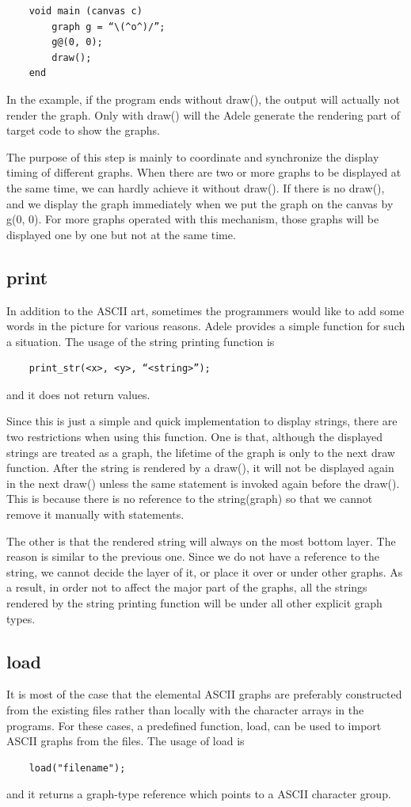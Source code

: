 \documentclass[11pt,letterpaper]{article}
\begin{document}
\begin{lstlisting}
	void main (canvas c)
		graph g = “\(^o^)/”;
		g@(0, 0);
		draw();
	end
\end{lstlisting}

In the example, if the program ends without draw(), the output will actually not render the graph. Only with draw() will the Adele generate the rendering part of target code to show the graphs.

The purpose of this step is mainly to coordinate and synchronize the display timing of different graphs. When there are two or more graphs to be displayed at the same time, we can hardly achieve it without draw(). If there is no draw(), and we display the graph immediately when we put the graph on the canvas by g\@(0, 0). For more graphs operated with this mechanism, those graphs will be displayed one by one but not at the same time.

\subsection {print}
In addition to the ASCII art, sometimes the programmers would like to add some words in the picture for various reasons. Adele provides a simple function for such a situation. The usage of the string printing function is
\begin{lstlisting}
	print_str(<x>, <y>, “<string>”);
\end{lstlisting}
and it does not return values.

Since this is just a simple and quick implementation to display strings, there are two restrictions when using this function. One is that, although the displayed strings are treated as a graph, the lifetime of the graph is only to the next draw function. After the string is rendered by a draw(), it will not be displayed again in the next draw() unless the same statement is invoked again before the draw(). This is because there is no reference to the string(graph) so that we cannot remove it manually with statements.

The other is that the rendered string will always on the most bottom layer. The reason is similar to the previous one. Since we do not have a reference to the string, we cannot decide the layer of it, or place it over or under other graphs. As a result, in order not to affect the major part of the graphs, all the strings rendered by the string printing function will be under all other explicit graph types.

\subsection {load}
It is most of the case that the elemental ASCII graphs are preferably constructed from the existing files rather than locally with the character arrays in the programs. For these cases, a predefined function, load, can be used to import ASCII graphs from the files. The usage of load is
\begin{lstlisting}
	load("filename");
\end{lstlisting}
and it returns a graph-type reference which points to a ASCII character group.
\end{document}
